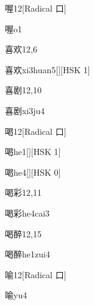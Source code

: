 \begin{entry}{喔}{12}[Radical 口]
  \begin{phonetics}{喔}{o1}
  \end{phonetics}
\end{entry}

\begin{entry}{喜欢}{12,6}
  \begin{phonetics}{喜欢}{xi3huan5}[][HSK 1]
  \end{phonetics}
\end{entry}

\begin{entry}{喜剧}{12,10}
  \begin{phonetics}{喜剧}{xi3ju4}
  \end{phonetics}
\end{entry}

\begin{entry}{喝}{12}[Radical 口]
  \begin{phonetics}{喝}{he1}[][HSK 1]
  \end{phonetics}
  \begin{phonetics}{喝}{he4}[][HSK 0]
  \end{phonetics}
\end{entry}

\begin{entry}{喝彩}{12,11}
  \begin{phonetics}{喝彩}{he4cai3}
  \end{phonetics}
\end{entry}

\begin{entry}{喝醉}{12,15}
  \begin{phonetics}{喝醉}{he1zui4}
  \end{phonetics}
\end{entry}

\begin{entry}{喻}{12}[Radical 口]
  \begin{phonetics}{喻}{yu4}
  \end{phonetics}
\end{entry}

